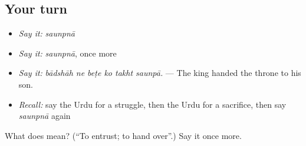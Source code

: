 \subsection*{Your turn}
\begin{itemize}
\raggedright
  \item \emph{Say it:} \emph{saunpnā}
  \item \emph{Say it:} \emph{saunpnā}, once more
  \item \emph{Say it:} \emph{bādshāh ne beṭe ko takht saunpā.} — The king handed the throne to his son.
  \item \emph{Recall:} say the Urdu for a struggle, then the Urdu for a sacrifice, then say \emph{saunpnā} again
\end{itemize}

\begin{tcolorbox}[breakable,colback=teal!4,colframe=teal!35!black,title={Before you move on}]
What does  mean? (\textquotedblleft{}To entrust; to hand over\textquotedblright{}.) Say it once more.
\end{tcolorbox}
